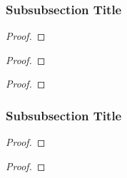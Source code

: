 
\begin{defn}
    \lipsum[1]
\end{defn}

\begin{exmp}
    \lipsum[1]
\end{exmp}

\begin{rmrk}
    \lipsum[1]
\end{rmrk}

\subsubsection{Subsubsection Title}

\begin{lemm}
    \lipsum[1]
\end{lemm}

\begin{proof}
    \lipsum[1]
\end{proof}

\begin{thrm}
    \lipsum[1]
\end{thrm}

\begin{proof}
    \lipsum[1]
\end{proof}

\begin{coro}
    \lipsum[1]
\end{coro}

\begin{proof}
    \lipsum[1]
\end{proof}

\subsubsection{Subsubsection Title}

\begin{lemm}
    \lipsum[1]
\end{lemm}

\begin{proof}
    \lipsum[1]
\end{proof}

\begin{thrm}
    \lipsum[1]
\end{thrm}

\begin{proof}
    \lipsum[1]
\end{proof}

